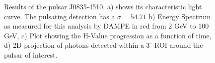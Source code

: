 \documentclass{PoS}
\begin{document}
\begin{figure}
\centering
{}
\hspace{\fill}
\centering
{}
\caption{Results of the pulsar J0835-4510, a)  shows its characteristic  light curve. The pulsating detection has a $ \sigma =54.71$ b) Energy Spectrum as measured for this analysis by DAMPE in red from 2 GeV to 100 GeV, c) Plot showing the H-Value progression as a function of time, d) 2D projection of photons detected within a $ 3^{\circ}$ ROI around the pulsar of interest.}\label{vela}
\end{figure}
\end{document}

